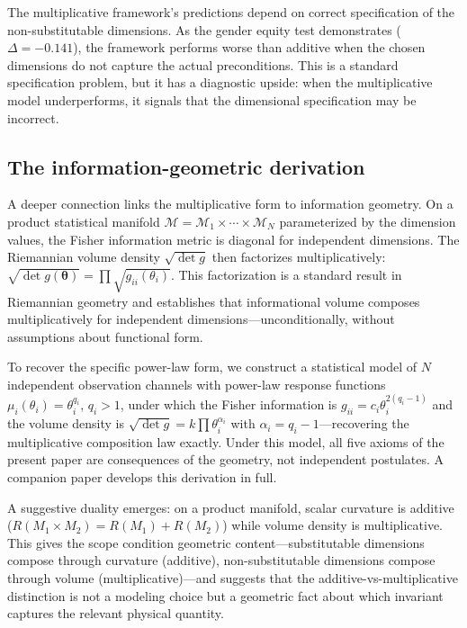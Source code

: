 \documentclass[12pt, a4paper]{article}
\theoremstyle{definition}
\theoremstyle{remark}
\begin{document}
The multiplicative framework's predictions depend on correct specification of the non-substitutable dimensions. As the gender equity test demonstrates ($\Delta = -0.141$), the framework performs worse than additive when the chosen dimensions do not capture the actual preconditions. This is a standard specification problem, but it has a diagnostic upside: when the multiplicative model underperforms, it signals that the dimensional specification may be incorrect.

\subsection{The information-geometric derivation}

A deeper connection links the multiplicative form to information geometry. On a product statistical manifold $\mathcal{M} = \mathcal{M}_1 \times \cdots \times \mathcal{M}_N$ parameterized by the dimension values, the Fisher information metric is diagonal for independent dimensions. The Riemannian volume density $\sqrt{\det g}$ then factorizes multiplicatively: $\sqrt{\det g(\boldsymbol{\theta})} = \prod \sqrt{g_{ii}(\theta_i)}$. This factorization is a standard result in Riemannian geometry and establishes that informational volume composes multiplicatively for independent dimensions---unconditionally, without assumptions about functional form.

To recover the specific power-law form, we construct a statistical model of $N$ independent observation channels with power-law response functions $\mu_i(\theta_i) = \theta_i^{q_i}$, $q_i > 1$, under which the Fisher information is $g_{ii} = c_i \theta_i^{2(q_i - 1)}$ and the volume density is $\sqrt{\det g} = k \prod \theta_i^{\alpha_i}$ with $\alpha_i = q_i - 1$---recovering the multiplicative composition law exactly. Under this model, all five axioms of the present paper are consequences of the geometry, not independent postulates. A companion paper \cite{kirsch2026ig} develops this derivation in full.

A suggestive duality emerges: on a product manifold, scalar curvature is additive ($R(M_1 \times M_2) = R(M_1) + R(M_2)$) while volume density is multiplicative. This gives the scope condition geometric content---substitutable dimensions compose through curvature (additive), non-substitutable dimensions compose through volume (multiplicative)---and suggests that the additive-vs-multiplicative distinction is not a modeling choice but a geometric fact about which invariant captures the relevant physical quantity.
\end{document}
